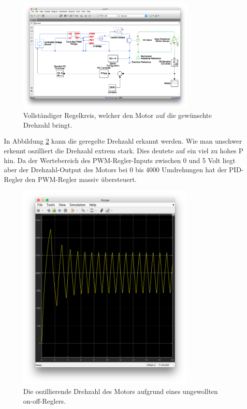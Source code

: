 \documentclass{fhnwreport} %
\begin{document}
\begin{figure}
\begin{center}
\includegraphics[trim={3.6cm 5.2cm 2.2cm 6.5cm},clip,width=0.8\textwidth]{pid}
\caption{Vollständiger Regelkreis, welcher den Motor auf die gewünschte Drehzahl bringt.}
\label{fig:pid}
\end{center}
\end{figure}

In Abbildung \ref{fig:first_osc} kann die geregelte Drehzahl erkannt werden. Wie man unschwer erkennt oszilliert die Drehzahl extrem stark. Dies deutete auf ein viel zu hohes P hin.
Da der Wertebereich des PWM-Regler-Inputs zwischen 0 und 5 Volt liegt aber der Drehzahl-Output des Motors bei 0 bis 4000 Umdrehungen hat der PID-Regler den PWM-Regler massiv übersteuert.

\begin{figure}
\begin{center}
\includegraphics[trim={2cm 8cm 2.2cm 4cm},clip,width=0.8\textwidth]{first_osc}
\caption{Die oszillierende Drehzahl des Motors aufgrund eines ungewollten on-off-Reglers.}
\label{fig:first_osc}
\end{center}
\end{figure}
\end{document}
